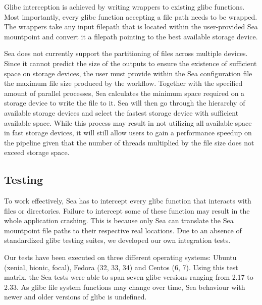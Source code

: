 \documentclass[10pt,journal,compsoc]{IEEEtran}
\newcommand{\todo}[1]{\marginpar{\parbox{18mm}{\flushleft\tiny\color{red}\textbf{TODO}:
#1}}}
\begin{document}
Glibc interception is achieved by writing wrappers to existing glibc functions.
Most importantly, every glibc function accepting a file path needs to be
wrapped. The wrappers take any input filepath that is located within the
user-provided Sea mountpoint and convert it a filepath pointing to the best
available storage device.

Sea does not currently support the partitioning of files across multiple
devices. Since it cannot predict the size of the outputs to ensure the existence
of sufficient space on storage devices, the user must provide within the Sea
configuration file the maximum file size produced by the workflow. Together with
the specified amount of parallel processes, Sea calculates the minimum space
required on a storage device to write the file to it.
Sea will then go through the hierarchy of available storage devices and select
the fastest storage device with sufficient available space. While this process
may result in not utilizing all available space in fast storage devices, it will
still allow users to gain a performance speedup on the pipeline given that the
number of threads multiplied by the file size does not exceed storage space.

\subsection{Testing}
To work effectively, Sea has to intercept every glibc function that interacts
with files or directories. Failure to intercept some of these function may
result in the whole application crashing. This is because only Sea can translate
the Sea mountpoint file paths to their respective real locations. Due to an
absence of standardized glibc testing suites, we developed our own integration
tests.

Our tests have been executed on three different operating systems: Ubuntu
(xenial, bionic, focal), Fedora (32, 33, 34) and Centos (6, 7). Using this test
matrix, the Sea tests were able to span seven glibc versions ranging from 2.17
to 2.33. As glibc file system functions may change over time, Sea behaviour with
newer and older versions of glibc is undefined. 
\end{document}
